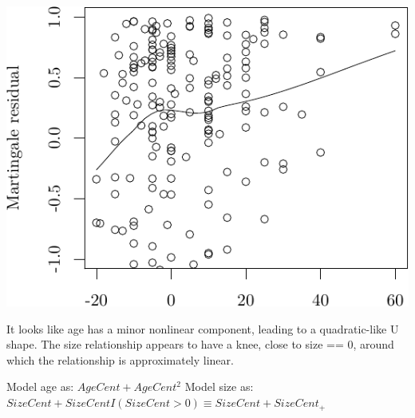 \documentclass{article}
\begin{document}
\begin{knitrout}
{\centering \includegraphics[width=\maxwidth]{figure/05-eda-func-form-size-2} 

}



\end{knitrout}
It looks like age has a minor nonlinear component, leading to a quadratic-like U shape.  The size relationship appears to have a knee, close to size == 0, around which the relationship is approximately linear.

Model age as:  $AgeCent + AgeCent^2$
Model size as: $SizeCent + SizeCent I(SizeCent > 0) \equiv SizeCent + SizeCent_+$

\begin{knitrout}
\color{fgcolor}\begin{kframe}
\begin{alltt}
\hlopt{$} \hlkwb{=} \hlopt{$} \hlopt{*} \hlopt{$} \hlopt{<} \hlstd{)}
\hlopt{$} \hlkwb{=} \hlopt{$}\hlopt{^}
\end{alltt}
\end{kframe}
\end{knitrout}
\end{document}
